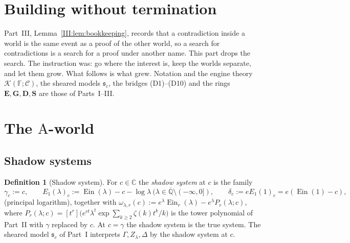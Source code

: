 \documentclass[11pt,a4paper]{article}
\newcommand{\C}{\mathbb C}
\newcommand{\Qbar}{\overline{\mathbb Q}}
\newcommand{\Ein}{\operatorname{Ein}}
\newcommand{\EE}{\mathbf E}
\newcommand{\GG}{\mathbf G}
\newcommand{\DD}{\mathbf D}
\newcommand{\Sring}{\mathbf S}
\newcommand{\Fld}{\mathbb F}
\newcommand{\Th}{\mathcal K}
\newcommand{\shear}{\mathfrak s}
\theoremstyle{definition}
\newtheorem{definition}[theorem]{Definition}
\theoremstyle{remark}
\numberwithin{equation}{section}
\begin{document}
\section{Building without termination}\label{IV:sec:intro}

Part~III, Lemma~\ref{III:lem:bookkeeping}, records that a contradiction inside a world is the same event as a
proof of the other world, so a search for contradictions is a search for a proof under
another name. This part drops the search. The instruction was: go where the interest is,
keep the worlds separate, and let them grow. What follows is what grew. Notation and the
engine theory $\Th(\Fld;\mathcal C)$, the sheared models $\shear_c$, the bridges
(D1)--(D10) and the rings $\EE,\GG,\DD,\Sring$ are those of Parts~I--III.

\section{The $\mathrm A$-world}\label{IV:sec:A}

\subsection{Shadow systems}

\begin{definition}[Shadow system]\label{IV:def:shadow}
For $c\in\C$ the \emph{shadow system} at $c$ is the family
\[
 \gamma_c:=c,\qquad E_1(\lambda)_c:=\Ein(\lambda)-c-\log\lambda\ (\lambda\in\Qbar\setminus(-\infty,0]),\qquad
 \delta_c:=eE_1(1)_c=e(\Ein(1)-c),
\]
(principal logarithm), together with $\omega_{\lambda,r}(c):=e^\lambda\Ein_r(\lambda)-e^\lambda P_r(\lambda;c)$,
where $P_r(\lambda;c)=[t^r]\bigl(e^{ct}\lambda^t\exp\sum_{k\ge2}\zeta(k)t^k/k\bigr)$ is the
tower polynomial of Part~II with $\gamma$ replaced by $c$. At $c=\gamma$ the shadow system
is the true system. The sheared model $\shear_c$ of Part~I interprets $\Gamma,Z_\lambda,\Delta$
by the shadow system at $c$.
\end{definition}
\end{document}
